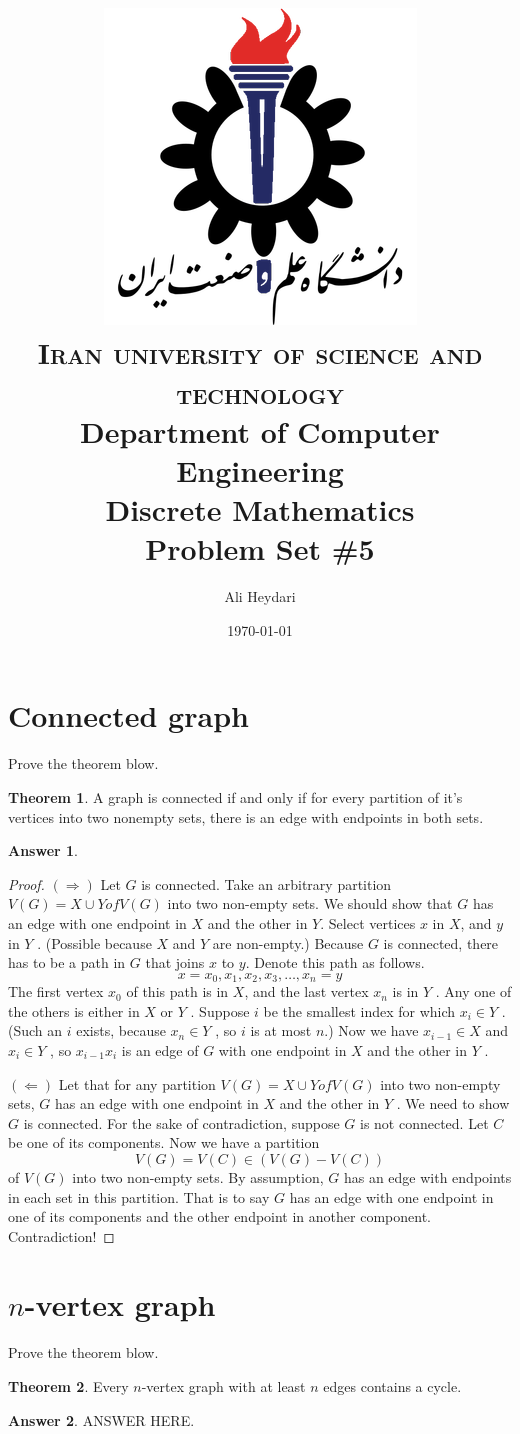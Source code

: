 \documentclass[a4paper]{article}
\title{
\textsc{
\center
\includegraphics[scale=0.5]{IUST_logo_color} \\
Iran university of science and technology} \\ [5pt] %
Department of Computer Engineering \\[8pt]
Discrete Mathematics\\Problem Set \#5 \\
}
\author{Ali Heydari}
\date{\today}
\renewcommand{\(}{\left(}
\renewcommand{\)}{\right)}
\theoremstyle{plain}
\theoremstyle{plain}
\theoremstyle{definition}
\newtheorem*{answer}{Answer}
\newtheorem{theorem}{Theorem}[section]
\begin{document}
\maketitle

\section{Connected graph}
Prove the theorem blow.
\begin{theorem}
A graph is connected if and only if for every partition of it's vertices into two nonempty sets, there
is an edge with endpoints in both sets.
\end{theorem}
\begin{shaded}
\begin{answer}
\begin{proof}
$(\Rightarrow)$ Let $G$ is connected. Take an arbitrary partition $V (G) = X \cup Y of V (G)$ into two non-empty sets. We should show that $G$ has an edge with one endpoint in $X$ and the other in $Y$. Select vertices $x$ in $X$, and $y$ in $Y$ . (Possible because $X$ and $Y$ are non-empty.) Because $G$ is connected, there has to be a path in $G$ that joins $x$ to $y$. Denote this path as follows.
$$x = x_0, x_1, x_2, x_3, \dots , x_n = y$$
The first vertex $x_0$ of this path is in $X$, and the last vertex $x_n$ is in $Y$ . Any one of the others is either in $X$ or $Y$ . Suppose $i$ be the smallest index for which $x_i \in Y$ . (Such an $i$ exists, because $x_n \in Y$ , so $i$ is at most $n$.) Now we have $x_{i-1} \in X$ and $x_i \in Y$ , so $x_{i-1}x_i$
is an edge of $G$ with one endpoint in $X$ and the other in $Y$ .

$(\Leftarrow)$ Let that for any partition $V (G) = X \cup Y of V (G)$ into two non-empty sets, $G$ has an edge with one endpoint in $X$ and the other in $Y$ . We need to show $G$ is connected. For the sake of contradiction, suppose $G$ is not connected. Let $C$ be one of its components. Now we have a partition
$$V (G) = V (C) \in (V (G) − V (C))$$
 of $V (G)$ into two non-empty sets. By assumption, $G$ has an edge with endpoints in each set in this partition. That is to say $G$ has an edge with one endpoint in one of its components and the other endpoint in another component. Contradiction!
 \end{proof}
\end{answer}
\end{shaded}

\section{$n$-vertex graph}
Prove the theorem blow.
\begin{theorem}
Every $n$-vertex graph with at least $n$ edges contains a cycle.
\end{theorem}
\begin{shaded}
\begin{answer}
ANSWER HERE.
\end{answer}
\end{shaded}
\end{document}
